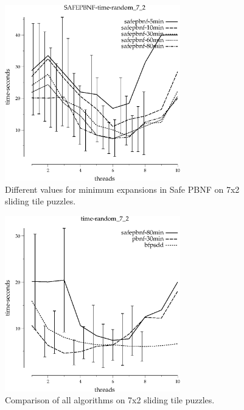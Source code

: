 \documentclass{article}
\begin{document}
\begin{figure}[h!]
\includegraphics[width=3in]{../graphs/tiles_random_7_2/SAFEPBNF-time-random_7_2.eps}
\caption{Different values for minimum expansions in Safe PBNF on 7x2 sliding tile puzzles.}
\end{figure}

\begin{figure}[h!]
\includegraphics[width=3in]{../graphs/tiles_random_7_2/time-random_7_2.eps}
\caption{Comparison of all algorithms on 7x2 sliding tile puzzles.}
\end{figure}
\end{document}
